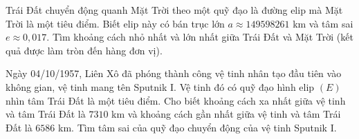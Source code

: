 \begin{vd}%
Trái Đất chuyển động quanh Mặt Trời theo một quỹ đạo là đường elip mà Mặt Trời là một tiêu điểm. Biết elip này có bán trục lớn $a\approx 149598261$ km và tâm sai $e\approx 0,017$. Tìm khoảng cách nhỏ nhất và lớn nhất giữa Trái Đất và Mặt Trời (kết quả được làm tròn đến hàng đơn vị).
\end{vd}

\begin{vd}%
Ngày 04/10/1957, Liên Xô đã phóng thành công vệ tinh nhân tạo đầu tiên vào không gian, vệ tinh mang tên Sputnik I. Vệ tinh đó có quỹ đạo hình elip $(E)$ nhìn tâm Trái Đất là một tiêu điểm. Cho biết khoảng cách xa nhất giữa vệ tinh và tâm Trái Đất là $7310$ km và khoảng cách gần nhất giữa vệ tinh và tâm Trái Đất là $6586$ km. Tìm tâm sai của quỹ đạo chuyển động của vệ tinh Sputnik I.
\end{vd}

